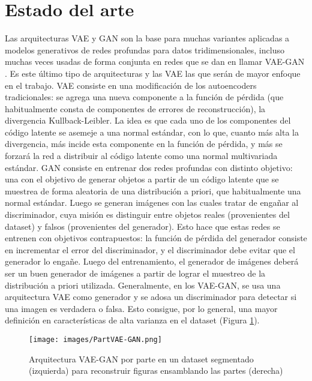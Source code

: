 \documentclass[spanish]{article}
\begin{document}
\section{Estado del arte}
Las arquitecturas VAE \cite{Kingma2013} y GAN \cite{Goodfellow2014} son la base para muchas variantes aplicadas a modelos generativos de redes profundas para datos tridimensionales, incluso muchas veces usadas de forma conjunta en redes que se dan en llamar VAE-GAN \cite{Li2019}. Es este último tipo de arquitecturas y las VAE las que serán de mayor enfoque en el trabajo. VAE consiste en una modificación de los autoencoders tradicionales: se agrega una nueva componente a la función de pérdida (que habitualmente consta de componentes de errores de reconstrucción), la divergencia Kullback-Leibler. La idea es que cada uno de los componentes del código latente se asemeje a una normal estándar, con lo que, cuanto más alta la divergencia, más incide esta componente en la función de pérdida, y más se forzará la red a distribuir al código latente como una normal multivariada estándar. GAN consiste en entrenar dos redes profundas con distinto objetivo: una con el objetivo de generar objetos a partir de un código latente que se muestrea de forma aleatoria de una distribución a priori, que habitualmente una normal estándar. Luego se generan imágenes con las cuales tratar de engañar al discriminador, cuya misión es distinguir entre objetos reales (provenientes del dataset) y falsos (provenientes del generador). Esto hace que estas redes se entrenen con objetivos contrapuestos: la función de pérdida del generador consiste en incrementar el error del discriminador, y el discriminador debe evitar que el generador lo engañe. Luego del entrenamiento, el generador de imágenes deberá ser un buen generador de imágenes a partir de lograr el muestreo de la distribución a priori utilizada. Generalmente, en los VAE-GAN, se usa una arquitectura VAE como generador y se adosa un discriminador para detectar si una imagen es verdadera o falsa. Esto consigue, por lo general, una mayor definición en características de alta varianza en el dataset (Figura \ref{PartVAE-GAN}).

\begin{figure}[h]
\texttt{[image: images/PartVAE-GAN.png]}
\centering
\caption{Arquitectura VAE-GAN por parte en un dataset segmentado (izquierda) para reconstruir figuras ensamblando las partes (derecha) \cite{Li2019}}
\label{PartVAE-GAN}
\end{figure}
\end{document}

